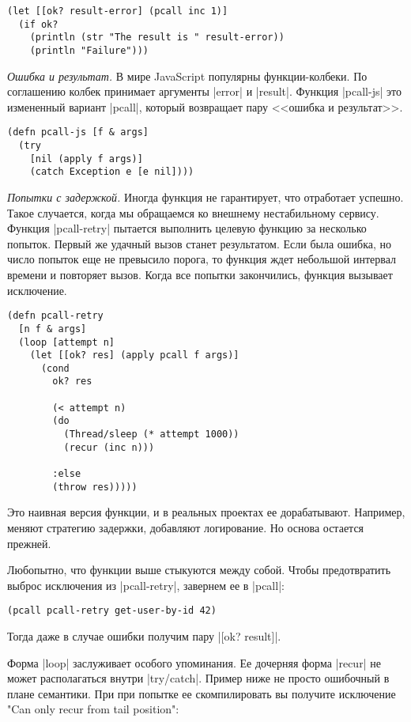 \begin{verbatim}
(let [[ok? result-error] (pcall inc 1)]
  (if ok?
    (println (str "The result is " result-error))
    (println "Failure")))
\end{verbatim}

\emph{Ошибка и результат.} В мире JavaScript популярны функции-колбеки. По
соглашению колбек принимает аргументы \spverb|error| и \spverb|result|. Функция
\spverb|pcall-js| это измененный вариант \spverb|pcall|, который возвращает пару
<<ошибка и результат>>.

\begin{verbatim}
(defn pcall-js [f & args]
  (try
    [nil (apply f args)]
    (catch Exception e [e nil])))
\end{verbatim}
\emph{Попытки с задержкой.} Иногда функция не гарантирует, что отработает
успешно. Такое случается, когда мы обращаемся ко внешнему нестабильному
сервису. Функция \spverb|pcall-retry| пытается выполнить целевую функцию за
несколько попыток. Первый же удачный вызов станет результатом. Если была ошибка,
но число попыток еще не превысило порога, то функция ждет небольшой интервал
времени и повторяет вызов. Когда все попытки закончились, функция вызывает
исключение.

\begin{verbatim}
(defn pcall-retry
  [n f & args]
  (loop [attempt n]
    (let [[ok? res] (apply pcall f args)]
      (cond
        ok? res

        (< attempt n)
        (do
          (Thread/sleep (* attempt 1000))
          (recur (inc n)))

        :else
        (throw res)))))
\end{verbatim}

Это наивная версия функции, и в реальных проектах ее дорабатывают. Например,
меняют стратегию задержки, добавляют логирование. Но основа остается прежней.

Любопытно, что функции выше стыкуются между собой. Чтобы предотвратить выброс
исключения из \spverb|pcall-retry|, завернем ее в \spverb|pcall|:

\begin{verbatim}
(pcall pcall-retry get-user-by-id 42)
\end{verbatim}

Тогда даже в случае ошибки получим пару \spverb|[ok? result]|.

Форма \spverb|loop| заслуживает особого упоминания. Ее дочерняя форма \spverb|recur| не может
располагаться внутри \spverb|try/catch|. Пример ниже не просто ошибочный в плане
семантики. При при попытке ее скомпилировать вы получите исключение "Can only
recur from tail position":

